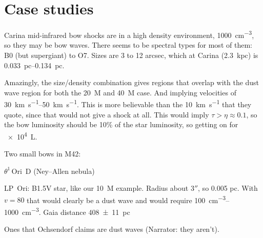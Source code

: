 \section{Case studies}
\label{sec:case-studies}

Carina mid-infrared bow shocks \citep{Sexton:2015b} are in a high
density environment, \SI{1000}{cm^{-3}}, so they may be bow waves.
There seems to be spectral types for most of them: B0 (but supergiant)
to O7.  Sizes are 3 to 12 arcsec, which at Carina (\SI{2.3}{kpc}) is
\SIrange{0.033}{0.134}{pc}.

Amazingly, the size/density combination gives regions that overlap
with the dust wave region for both the \SI{20}{M_\odot} and \SI{40}{M_\odot}
case.  And implying velocities of \SIrange{30}{50}{km.s^{-1}}.  This
is more believable than the \SI{10}{km.s^{-1}} that they quote, since
that would not give a shock at all.  This would imply
\(\tau > \eta \approx 0.1\), so the bow luminosity should be 10\% of the star
luminosity, so getting on for \SI{e4}{L_\odot}.

Two small bows in M42:

\(\theta^1\)\,Ori~D (Ney--Allen nebula) \citep{Robberto:2005a}

LP~Ori: B1.5V star, like our \SI{10}{M_\odot} example. Radius about
\(3''\), so 0.005 pc.  With \(v = 80\) that would clearly be a dust
wave and would require \SIrange{100}{1000}{cm^{-3}}. Gaia distance \SI{408 +- 11}{pc}


Ones that Ochsendorf claims are dust waves (Narrator: they aren't).


